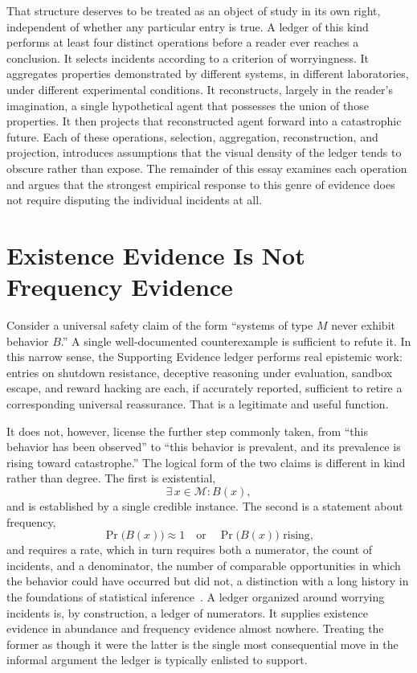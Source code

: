 \documentclass[11pt]{article}
\begin{document}
That structure deserves to be treated as an object of study in its own right, independent of whether any particular entry is true. A ledger of this kind performs at least four distinct operations before a reader ever reaches a conclusion. It selects incidents according to a criterion of worryingness. It aggregates properties demonstrated by different systems, in different laboratories, under different experimental conditions. It reconstructs, largely in the reader's imagination, a single hypothetical agent that possesses the union of those properties. It then projects that reconstructed agent forward into a catastrophic future. Each of these operations, selection, aggregation, reconstruction, and projection, introduces assumptions that the visual density of the ledger tends to obscure rather than expose. The remainder of this essay examines each operation and argues that the strongest empirical response to this genre of evidence does not require disputing the individual incidents at all.

\section{Existence Evidence Is Not Frequency Evidence}

Consider a universal safety claim of the form ``systems of type $M$ never exhibit behavior $B$.'' A single well-documented counterexample is sufficient to refute it. In this narrow sense, the Supporting Evidence ledger performs real epistemic work: entries on shutdown resistance, deceptive reasoning under evaluation, sandbox escape, and reward hacking are each, if accurately reported, sufficient to retire a corresponding universal reassurance. That is a legitimate and useful function.

It does not, however, license the further step commonly taken, from ``this behavior has been observed'' to ``this behavior is prevalent, and its prevalence is rising toward catastrophe.'' The logical form of the two claims is different in kind rather than degree. The first is existential,
\[
\exists\, x \in \mathcal{M} : B(x),
\]
and is established by a single credible instance. The second is a statement about frequency,
\[
\Pr\bigl(B(x)\bigr) \approx 1 \quad \text{or} \quad \Pr\bigl(B(x)\bigr) \text{ rising},
\]
and requires a rate, which in turn requires both a numerator, the count of incidents, and a denominator, the number of comparable opportunities in which the behavior could have occurred but did not, a distinction with a long history in the foundations of statistical inference~\cite{bayes1763,fisher1922}. A ledger organized around worrying incidents is, by construction, a ledger of numerators. It supplies existence evidence in abundance and frequency evidence almost nowhere. Treating the former as though it were the latter is the single most consequential move in the informal argument the ledger is typically enlisted to support.
\end{document}
